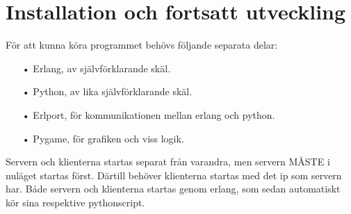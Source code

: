 \documentclass{scrartcl}
\begin{document}
\smallskip
\section{Installation och fortsatt utveckling}
För att kunna köra programmet behövs följande separata delar:
\begin{enumerate}
\item[•] Erlang, av självförklarande skäl.
\item[•] Python, av lika självförklarande skäl.
\item[•] Erlport, för kommunikationen mellan erlang och python.
\item[•] Pygame, för grafiken och viss logik.
\end{enumerate}
\smallskip

Servern och klienterna startas separat från varandra, men servern MÅSTE i nuläget startas först. Därtill behöver klienterna startas med det ip som servern har. \linebreak
Både servern och klienterna startas genom erlang, som sedan automatiskt kör sina respektive pythonscript.
\end{document}
